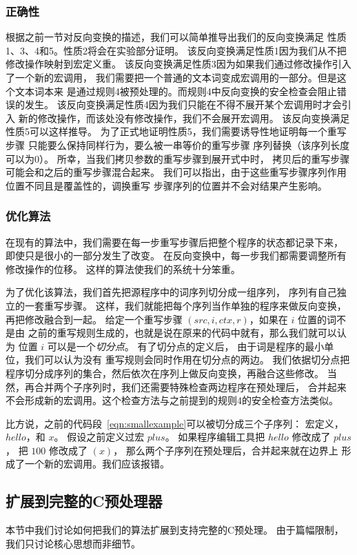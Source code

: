 \subsubsection{正确性}\label{sec:correctness}
根据之前一节对反向变换的描述，我们可以简单推导出我们的反向变换满足
性质1、3、4和5。性质2将会在实验部分证明。
该反向变换满足性质1因为我们从不把修改操作映射到宏定义重。
该反向变换满足性质3因为如果我们通过修改操作引入了一个新的宏调用，
我们需要把一个普通的文本词变成宏调用的一部分。但是这个文本词本来
是通过规则4被预处理的。而规则4中反向变换的安全检查会阻止错误的发生。
该反向变换满足性质4因为我们只能在不得不展开某个宏调用时才会引入
新的修改操作，而该处没有修改操作，我们不会展开宏调用。
该反向变换满足性质5可以这样推导。
为了正式地证明性质5，我们需要诱导性地证明每一个重写步骤
只能要么保持同样行为，要么被一串等价的重写步骤
序列替换（该序列长度可以为0）。
所幸，当我们拷贝参数的重写步骤到展开式中时，
拷贝后的重写步骤可能会和之后的重写步骤混合起来。
我们可以指出，由于这些重写步骤序列作用位置不同且是覆盖性的，调换重写
步骤序列的位置并不会对结果产生影响。

\subsubsection{优化算法}\label{sec:optimization}
在现有的算法中，我们需要在每一步重写步骤后把整个程序的状态都记录下来，
即使只是很小的一部分发生了改变。
在反向变换中，每一步我们都需要调整所有修改操作的位移。
这样的算法使我们的系统十分笨重。

为了优化该算法，我们首先把源程序中的词序列切分成一组序列，
序列有自己独立的一套重写步骤。
这样，我们就能把每个序列当作单独的程序来做反向变换，再把修改融合到一起。
给定一个重写步骤 $(src, i, ctx, r)$，如果在 $i$ 位置的词不是由
之前的重写规则生成的，也就是说在原来的代码中就有，那么我们就可以认为
位置 $i$ 可以是一个\emph{切分点}。
有了切分点的定义后， 由于词是程序的最小单位，我们可以认为没有
重写规则会同时作用在切分点的两边。
我们依据切分点把程序切分成序列的集合，然后依次在序列上做反向变换，再融合这些修改。
当然，再合并两个子序列时，我们还需要特殊检查两边程序在预处理后，
合并起来不会形成新的宏调用。这个检查方法与之前提到的规则4的安全检查方法类似。

比方说，之前的代码段~\ref{eqn:smallexample}可以被切分成三个子序列：
宏定义， $hello$，和 $x$。
假设之前定义过宏 $plus$。 如果程序编辑工具把 $hello$ 修改成了 $plus$，
把 $100$ 修改成了 $(x)$， 那么两个子序列在预处理后，合并起来就在边界上
形成了一个新的宏调用。我们应该报错。


\subsection{扩展到完整的C预处理器}\label{sec:fullC}
本节中我们讨论如何把我们的算法扩展到支持完整的C预处理。
由于篇幅限制，我们只讨论核心思想而非细节。


